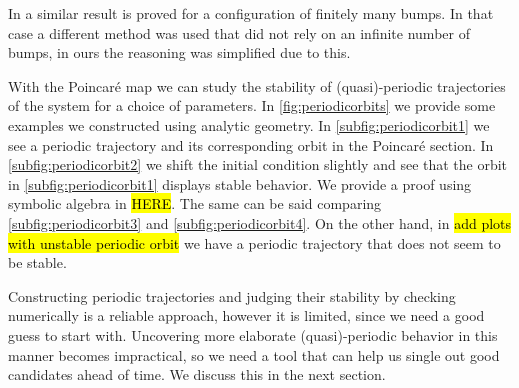 In \cite{Knauf_2017} a similar result is proved for a configuration of finitely many bumps. In that case a different method was used that did not rely on an infinite number of bumps, in ours the reasoning was simplified due to this.

With the Poincar\'e map we can study the stability of (quasi)-periodic trajectories of the system for a choice of parameters. In \cref{fig:periodicorbits} we provide some examples we constructed using analytic geometry. In \cref{subfig:periodicorbit1} we see a periodic trajectory and its corresponding orbit in the Poincar\'e section. In \cref{subfig:periodicorbit2} we shift the initial condition slightly and see that the orbit in \cref{subfig:periodicorbit1} displays stable behavior. We provide a proof using symbolic algebra in \hl{HERE}. The same can be said comparing \cref{subfig:periodicorbit3} and \cref{subfig:periodicorbit4}. On the other hand, in \hl{add plots with unstable periodic orbit} we have a periodic trajectory that does not seem to be stable.

Constructing periodic trajectories and judging their stability by checking numerically is a reliable approach, however it is limited, since we need a good guess to start with. Uncovering more elaborate (quasi)-periodic behavior in this manner becomes impractical, so we need a tool that can help us single out good candidates ahead of time. We discuss this in the next section.




